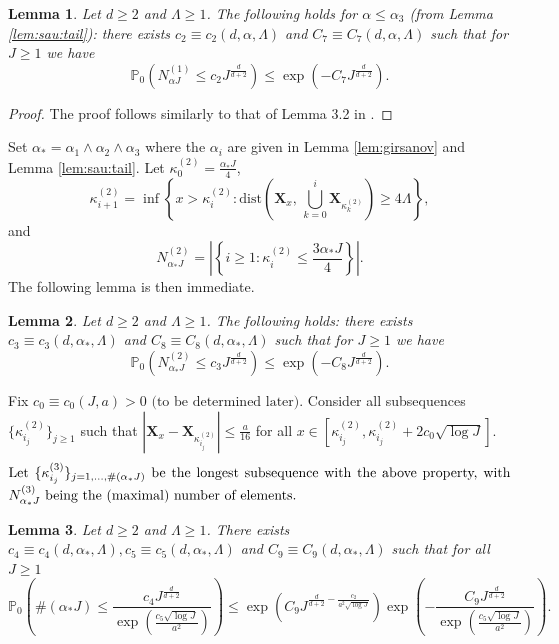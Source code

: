 \documentclass[12pt]{amsart}
\numberwithin{equation}{section}
\newtheorem{lem}{Lemma}[section]
\theoremstyle{definition}
\numberwithin{equation}{section}
\newcommand{\mP}{\mathbb{P}}
\newcommand{\X}{\mathbf{X}}
\begin{document}
\begin{lem}\label{lem:disjoint:ball}
Let $d\ge 2$ and $\Lambda\ge 1$. The following holds for $\alpha \le \alpha_3$ (from Lemma \ref{lem:sau:tail}): there exists $c_2\equiv c_2(d,\alpha,\Lambda)$ and  $C_7\equiv C_7(d,\alpha,\Lambda)$  such that for $J\ge 1$ we have 
\[  \mP_0\left(N^{(1)}_{\alpha J}\le c_2J^{\frac{d}{d+2}}\right) \le \exp\left(-C_7 J^{\frac{d}{d+2}}\right).\]
\end{lem}
\begin{proof}
The proof follows similarly to that of Lemma 3.2 in \cite{ajm23}.
  \end{proof}

Set  $\alpha_*=\alpha_1\wedge \alpha_2\wedge \alpha_3$ where the $\alpha_i$ are given in Lemma \ref{lem:girsanov} and Lemma \ref{lem:sau:tail}. Let $\kappa^{(2)}_0 =\frac{\alpha_*J}{4}$,
\[ \kappa^{(2)}_{i+1}=\inf\left\{x>\kappa^{(2)}_i: \text{dist}\left(\X_x,\, \bigcup_{k=0}^i \X_{\kappa^{(2)}_k}\right)\ge 4\Lambda\right\}, \]
and
\[ N^{(2)}_{\alpha_* J} =\left\vert\left\{i\ge 1: \kappa^{(2)}_i \le \frac{3\alpha_* J}{4}\right\} \right\vert. \]
{The following lemma is then  immediate.}
\begin{lem} \label{lem:no:tildekappa}
Let $d\ge 2$ and $\Lambda\ge 1$. The following holds: there exists $c_3\equiv c_3(d,\alpha_*,\Lambda)$ and  $C_8\equiv C_8(d,\alpha_*,\Lambda)$ such that for $J\ge 1$ we have 
\[  \mP_0\left(N^{(2)}_{\alpha_* J}\le c_3J^{\frac{d}{d+2}}\right) \le \exp\left(-C_8 J^{\frac{d}{d+2}}\right).\]
\end{lem}
Fix $c_0\equiv c_0(J,a)>0  \text{ (to be determined later)}$. Consider all 
subsequences $\{\kappa^{(2)}_{i_j}\}_{j \geq 1}$ such that $|\X_x- \X_{\kappa^{(2)}_{i_j}}|\le \frac{a}{16}$ for all $x\in [\kappa^{(2)}_{i_j}, \kappa^{(2)}_{i_j}+2c_0\sqrt{\log J}]$.
\begin{equation} \label{eq:kappa}
\mbox{\parbox{5in}{
Let $\{{\kappa_{i_j}^{(3)}} \}_{j=1, \ldots,\#(\alpha_*J)}$ be the longest subsequence with the above property, with $N^{(3)}_{\alpha_*J}$ being the (maximal) number of elements.
}}
\end{equation}
\begin{lem} \label{lem:barkappa}
Let $d\ge 2$ and $\Lambda\ge 1$. There exists $c_4\equiv c_4(d,\alpha_*,\Lambda), c_5\equiv c_5(d,\alpha_*,\Lambda)$ and $C_9\equiv C_9(d,\alpha_*,\Lambda)$ such that for all $J\ge 1$
\[  \mP_0\left(\#(\alpha_* J)\le \frac{c_4J^{\frac{d}{d+2}} }{\exp\left(\frac{c_5 \sqrt{\log J}}{a^2}\right)}\right) \le \exp \left (C_9 J^{\frac{d}{d+2} -\frac{c_2}{a^2 \sqrt{\log J} }} \right) \exp\left(-\frac{C_9 J^{\frac{d}{d+2}} }{\exp\left(\frac{c_5 \sqrt{\log J}}{a^2}\right)}\right).\]
\end{lem}
\end{document}
